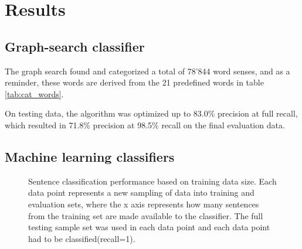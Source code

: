 \documentclass[a4paper,11pt]{kth-mag}
\begin{document}
\clearpage


\section{Results}

\subsection{Graph-search classifier}
The graph search found and categorized a total of 78'844 word senses, and as a reminder,
these words are derived from the 21 predefined words in table \ref{tab:cat_words}.

On testing data, the algorithm was optimized up to 83.0\% precision at full recall,
which resulted in 71.8\% precision at 98.5\% recall on the final evaluation data.

\subsection{Machine learning classifiers}

\begin{figure}[h]
  \centering

  \caption{Sentence classification performance based on training data size. Each data point represents a new
    sampling of data into training and evaluation sets, where the x axis represents how many sentences from the
    training set are made available to the classifier. The full testing sample set was used in each data point and
    each data point had to be classified(recall=1).
  }
  \label{fig:data_size}
\end{figure}
\end{document}
